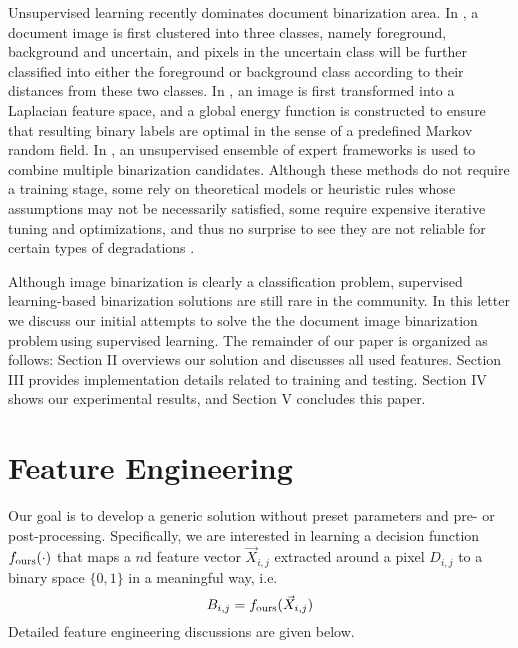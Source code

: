 \documentclass[onecolumn,11pt,draftcls,journal]{IEEEtran}
\def \dibp{the document image binarization problem\,}
\begin{document}
Unsupervised learning recently dominates document binarization area. In \cite{Su2012}, a document image is first clustered into three classes, namely foreground, background and uncertain, and pixels in the uncertain class will be further classified into either the foreground or background class according to their distances from these two classes. In \cite{Howe2011,Howe2013}, an image is first transformed into a Laplacian feature space, and a global energy function is constructed to  
ensure that resulting binary labels are optimal in the sense of a predefined Markov random field. In \cite{EoE2012}, an unsupervised ensemble of expert frameworks is used to combine multiple binarization candidates. Although these methods do not require a training stage, some rely on theoretical models or heuristic rules whose assumptions may not be necessarily satisfied, some require expensive iterative tuning and optimizations, and thus no surprise to see they are not reliable for certain types of degradations \cite{Phase2014}. 

Although image binarization is clearly a classification problem, supervised learning-based binarization solutions are still rare in the community. In this letter we discuss our initial attempts to solve the \dibp using supervised learning. The remainder of our paper is organized as follows: Section II overviews our solution and discusses all used features. Section III provides implementation details related to training and testing. Section IV shows our experimental results, and Section V concludes this paper.  

\section{Feature Engineering}
Our goal is to develop a generic solution without preset parameters and pre- or post-processing. Specifically, we are interested in learning a decision function $f_{\rm{ours}}(\cdot)$ that maps a $n$d feature vector $\vec{X}_{i,j}$ extracted around a pixel $D_{i,j}$ to a binary space $\{0,1\}$ in a meaningful way, i.e.
\begin{equation}
B_{i,j}=f_{\rm{ours}}(\vec{X}_{i,j})
\label{eq.binours}
\end{equation}
Detailed feature engineering discussions are given below.
\end{document}
